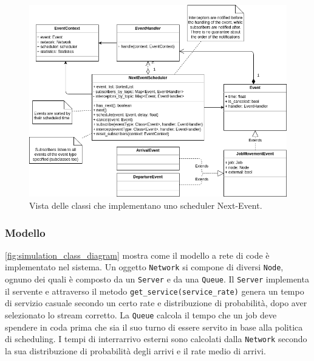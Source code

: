 \begin{figure}
    \centering
    \includegraphics[width=\linewidth]{figs/diagrams/scheduler.drawio.png}
    \caption{Vista delle classi che implementano uno scheduler Next-Event.}
    \label{fig:scheduler_nextevent_class_diagram}
\end{figure}

\subsubsection{Modello}
\autoref{fig:simulation_class_diagram} mostra come il modello a rete di code è implementato nel sistema. Un oggetto \texttt{Network} si compone di diversi \texttt{Node}, ognuno dei quali è composto da un \texttt{Server} e da una \texttt{Queue}. Il \texttt{Server} implementa il servente e attraverso il metodo \texttt{get\_service(service\_rate)} genera un tempo di servizio casuale secondo un certo rate e distribuzione di probabilità, dopo aver selezionato lo stream corretto. La \texttt{Queue} calcola il tempo che un job deve spendere in coda prima che sia il suo turno di essere servito in base alla politica di scheduling. I tempi di interrarrivo esterni sono calcolati dalla \texttt{Network} secondo la sua distribuzione di probabilità degli arrivi e il rate medio di arrivi.

